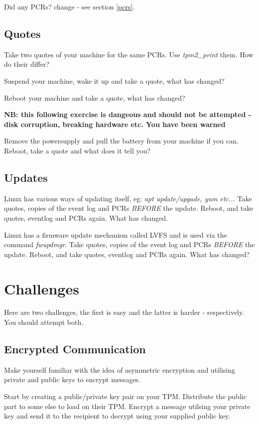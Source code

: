 \documentclass[11pt,a4paper]{article}
\begin{document}
Did any PCRs? change - see section \ref{pcrs}.

\subsection{Quotes}
Take two quotes of your machine for the same PCRs. Use \textit{tpm2\_print} them. How do their differ?

Suspend your machine, wake it up and take a quote, what has changed?

Reboot your machine and take a quote, what has changed?

\textbf{NB: this following exercise is dangeous and should not be attempted - disk corruption, breaking hardware etc. You have been warned}

Remove the powersupply and pull the battery from your machine if you can. Reboot, take a quote and what does it tell you?

\subsection{Updates}
Linux has various ways of updating itself, eg: \textit{apt update/upgade, yum etc...} Take quotes, copies of the event log and PCRs \textit{BEFORE} the update. Reboot, and take quotes, eventlog and PCRs again.  What has changed.

Linux has a firmware update mechanism called LVFS and is used via the command \textit{fwupdmgr}. Take quotes, copies of the event log and PCRs \textit{BEFORE} the update. Reboot, and take quotes, eventlog and PCRs again.  What has changed?




\section{Challenges}
Here are two challenges, the first is easy and the latter is harder - respectively. You should attempt both.

\subsection{Encrypted Communication}
Make yourself familiar with the idea of asymmetric encryption and utilising private and public keys to encrypt messages.

Start by creating a public/private key pair on your TPM. Distribute the public part to some else to load on their TPM. Encrypt a message utilsing your private key and send it to the recipient to decrypt using your supplied public key.
\end{document}
